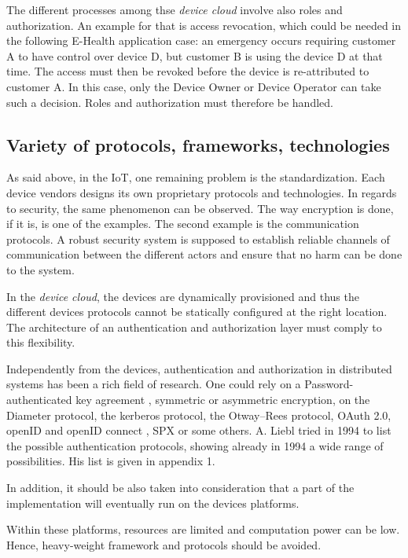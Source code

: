 The different processes among thse \emph{device cloud} involve also roles and authorization. An example for that is access revocation, which could be needed in the following E-Health application case: an emergency occurs requiring customer A to have control over device D, but customer B is using the device D at that time. The access must then be revoked before the device is re-attributed to customer A. In this case, only the Device Owner or Device Operator can take such a decision. Roles and authorization must therefore be handled.

\subsection{Variety of protocols, frameworks, technologies}
As said above, in the IoT, one remaining problem is the standardization. Each device vendors designs its own proprietary protocols and technologies. In regards to security, the same phenomenon can be observed. The way encryption is done, if it is, is one of the examples. The second example is the communication protocols. A robust security system is supposed to establish reliable channels of communication between the different actors and ensure that no harm can be done to the system. 

In the \emph{device cloud}, the devices are dynamically provisioned and thus the different devices protocols cannot be statically configured at the right location. The architecture of an authentication and authorization layer must comply to this flexibility.

Independently from the devices, authentication and authorization in distributed systems has been a rich field of research. One could rely on a Password-authenticated key agreement \cite{Hao2011}\cite{Pointcheval2012}\cite{Juang2008}, symmetric or asymmetric encryption\cite{Denning1982}, on the Diameter protocol, the kerberos protocol\cite{neuman2005kerberos}, the Otway–Rees protocol, OAuth 2.0\cite{hardt2012oauth}, openID\cite{Ghazizadeh} and openID connect \cite{sakimura2014openid}, SPX\cite{Tardo1991} or some others. A. Liebl tried in 1994 to list the possible authentication protocols, showing already in 1994 a wide range of possibilities. His list is given in appendix 1\cite{Liebl1993}.

In addition, it should be also taken into consideration that a part of the implementation will eventually run on the devices platforms. 

Within these platforms, resources are limited and computation power can be low. Hence, heavy-weight framework and protocols should be avoided.

